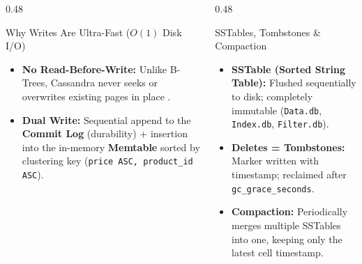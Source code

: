 \documentclass[aspectratio=169]{beamer}
\begin{document}
\begin{frame}
\vspace{0.15cm}
\begin{columns}[T]
\begin{column}{0.48\textwidth}
\begin{block}{Why Writes Are Ultra-Fast ($O(1)$ Disk I/O)}
\scriptsize
\begin{itemize}
    \item \textbf{No Read-Before-Write:} Unlike B-Trees, Cassandra never seeks or overwrites existing pages in place \cite{lsm}.
    \item \textbf{Dual Write:} Sequential append to the \textbf{Commit Log} (durability) + insertion into the in-memory \textbf{Memtable} sorted by clustering key (\texttt{price ASC, product\_id ASC}).
\end{itemize}
\end{block}
\end{column}
\begin{column}{0.48\textwidth}
\begin{block}{SSTables, Tombstones \& Compaction}
\scriptsize
\begin{itemize}
    \item \textbf{SSTable (Sorted String Table):} Flushed sequentially to disk; completely immutable (\texttt{Data.db}, \texttt{Index.db}, \texttt{Filter.db}).
    \item \textbf{Deletes = Tombstones:} Marker written with timestamp; reclaimed after \texttt{gc\_grace\_seconds}.
    \item \textbf{Compaction:} Periodically merges multiple SSTables into one, keeping only the latest cell timestamp.
\end{itemize}
\end{block}
\end{column}
\end{columns}
\end{frame}
\end{document}
